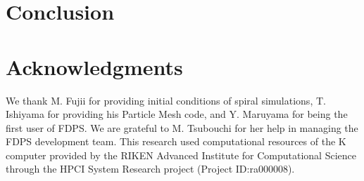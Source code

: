 \documentclass{acm_proc_article-sp}
\begin{document}


\section{Conclusion}
\label{sec:conclusion}




\section{Acknowledgments}

We thank M. Fujii for providing initial conditions of spiral
simulations, T. Ishiyama for providing his Particle Mesh code, and
Y. Maruyama for being the first user of FDPS.  We are grateful to
M. Tsubouchi for her help in managing the FDPS development team. This
research used computational resources of the K computer provided by
the RIKEN Advanced Institute for Computational Science through the
HPCI System Research project (Project ID:ra000008).



\end{document}
